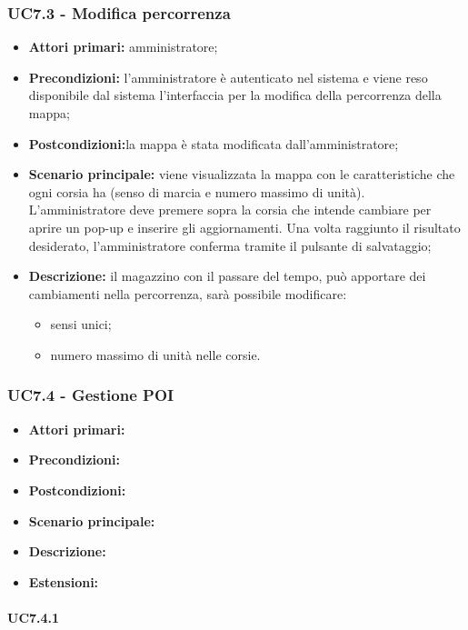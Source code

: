 \subsubsection{UC7.3 - Modifica percorrenza}
\begin{itemize}
	\item 	\textbf{Attori primari:} amministratore;
	\item 	\textbf{Precondizioni:}  l’amministratore è autenticato nel sistema e viene reso disponibile dal sistema l’interfaccia per la modifica della percorrenza della mappa;
	\item 	\textbf{Postcondizioni:}la mappa è stata modificata dall’amministratore;
	\item 	\textbf{Scenario principale:} viene visualizzata la mappa con le caratteristiche che ogni corsia ha (senso di marcia e numero massimo di unità). L’amministratore deve premere sopra la corsia che intende cambiare per aprire un pop-up e inserire gli aggiornamenti. Una volta raggiunto il risultato desiderato, l’amministratore conferma tramite il pulsante di salvataggio;
	\item 	\textbf{Descrizione:} il magazzino con il passare del tempo, può apportare dei cambiamenti nella percorrenza, sarà possibile modificare:
	\begin{itemize}
		\item sensi unici;
		\item numero massimo di unità nelle corsie.
	\end{itemize}
\end{itemize}

\subsubsection{UC7.4 - Gestione POI}
\begin{itemize}
	\item 	\textbf{Attori primari:}
	\item 	\textbf{Precondizioni:}
	\item 	\textbf{Postcondizioni:}
	\item 	\textbf{Scenario principale:}
	\item 	\textbf{Descrizione:}
	\item 	\textbf{Estensioni:}
\end{itemize}

\paragraph{UC7.4.1 }
